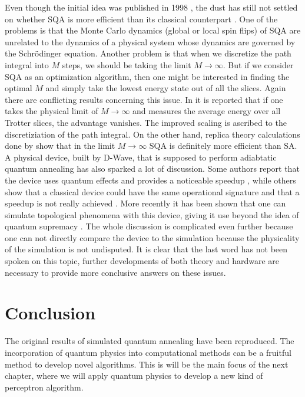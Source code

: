 Even though the initial idea was published in 1998 \cite{kadowaki1998}, the dust has still not settled on whether SQA is more efficient than its classical counterpart \cite{Mbeng2018}. 
One of the problems is that the Monte Carlo dynamics (global or local spin flips) of SQA are unrelated to the dynamics of a physical system whose dynamics are governed by the Schr\"odinger equation. Another problem is that when we discretize the path integral into $M$ steps, we should be taking the limit $M\rightarrow\infty$. But if we consider SQA as an optimization algorithm, then one might be interested in finding the optimal $M$ and simply take the lowest energy state out of all the slices. Again there are conflicting results concerning this issue. In \cite{Heim2015} it is reported that if one takes the physical limit of $M\rightarrow\infty$ and measures the average energy over all Trotter slices, the advantage vanishes. The improved scaling is ascribed to the discretiziation of the path integral. On the other hand, replica theory calculations done by \cite{Baldassi2018} show that in the limit $M\rightarrow\infty$ SQA is definitely more efficient than SA. A physical device, built by D-Wave, that is supposed to perform adiabtatic quantum annealing has also sparked a lot of discussion. Some authors report that the device uses quantum effects and provides a noticeable speedup \cite{Boixo2014, Muthukrishnan2016}, while others show that a classical device could have the same operational signature and that a speedup is not really achieved \cite{Smolin2013, Ronnow2014}. More recently it has been shown that one can simulate topological phenomena with this device, giving it use beyond the idea of quantum supremacy \cite{King2018}. The whole discussion is complicated even further because one can not directly compare the device to the simulation because the physicality of the simulation is not undisputed. It is clear that the last word has not been spoken on this topic, further developments of both theory and hardware are necessary to provide more conclusive answers on these issues.

\section{Conclusion}

The original results of simulated quantum annealing have been reproduced. The incorporation of quantum physics into computational methods can be a fruitful method to develop novel algorithms. This is will be the main focus of the next chapter, where we will apply quantum physics to develop a new kind of perceptron algorithm.